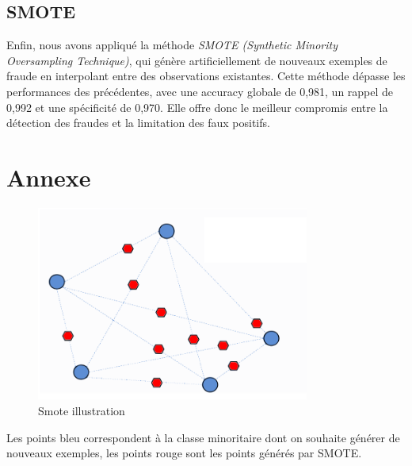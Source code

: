 \documentclass[a4paper,12pt]{article}
\begin{document}
\subsection*{SMOTE}
Enfin, nous avons appliqué la méthode \textit{SMOTE (Synthetic Minority Oversampling Technique)}, qui génère artificiellement de nouveaux exemples de fraude en interpolant entre des observations existantes.
Cette méthode dépasse les performances des précédentes, avec une accuracy globale de 0,981, un rappel de 0,992 et une spécificité de 0,970.
Elle offre donc le meilleur compromis entre la détection des fraudes et la limitation des faux positifs.



\newpage

\section*{Annexe}

\begin{figure}[h!]
    \centering
    \includegraphics[width=0.8\textwidth]{images/smote.png}
    \caption{Smote illustration}
    \label{fig:example}
\end{figure}
Les points bleu correspondent à la classe minoritaire dont on souhaite générer de nouveaux exemples, les points rouge sont les points générés par SMOTE.

\newpage

\printbibliography
\end{document}
